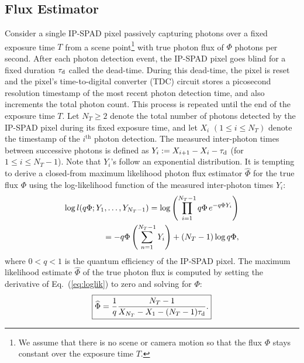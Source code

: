 \subsection{Flux Estimator \label{sec:flux_estimator}}
Consider a single IP-SPAD pixel passively capturing photons over a fixed
exposure time $T$ from a scene point\footnote{We assume that there is no scene
or camera motion so that the flux $\Phi$ stays constant over the exposure time
$T$.} with true photon flux of $\Phi$ photons per second.  After each photon
detection event, the IP-SPAD pixel goes blind for a fixed duration $\tau_\text{d}$
called the dead-time. During this dead-time, the pixel is reset and the pixel's
time-to-digital converter (TDC)
circuit stores a picosecond resolution timestamp of the most recent
photon detection time, and also increments the total photon count. This process
is repeated until the end of the exposure time $T$. Let $N_T \geq 2$ denote the
total number of photons detected by the IP-SPAD pixel during its fixed exposure
time, and let $X_i$ $(1\leq i \leq N_T)$ denote the timestamp of the
$i^\text{th}$ photon detection.  The measured inter-photon times
between successive photons is defined as $Y_i := X_{i+1} -
X_{i} - \tau_\text{d}$ (for $1 \leq i \leq N_T-1$). Note that $Y_i$'s follow an exponential
distribution. It is tempting to derive a closed-from maximum
likelihood photon flux estimator $\widehat\Phi$ for the true flux $\Phi$
using the log-likelihood function of the measured inter-photon times $Y_i$:
\begin{align}
\vspace{-0.15in}
  \log l(q\Phi; Y_1,\ldots,Y_{N_T-1}) = \log \left( \prod_{i=1}^{N_T-1}
                     q\Phi\,e^{-q\Phi Y_i} \right) \nonumber \\
  = - q\Phi \left( \sum_{n=1}^{N_T-1} Y_i \right) + (N_T-1)
                    \log q\Phi, \label{eq:loglik}
\vspace{-0.15in}
\end{align}
where $0\!\!<q<\!\!1$ is the quantum efficiency of the IP-SPAD pixel.
The maximum likelihood estimate $\widehat\Phi$ of the true photon flux is
computed by setting the derivative of Eq.~(\ref{eq:loglik}) to zero and
solving for $\Phi$:
\begin{equation}
\boxed{
  \widehat{\Phi} = \frac{1}{q}\frac{N_T-1}{X_{N_T}-X_1-(N_T-1)\tau_\text{d}}.
  \label{eq:flux_estimator}
}
\end{equation}

